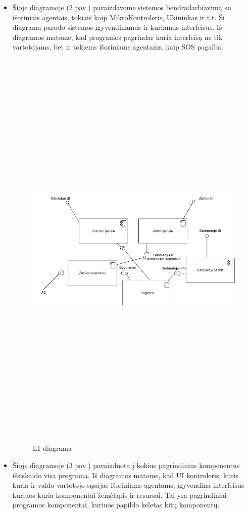 \documentclass[oneside]{VUMIFPSkursinis}
\begin{document}
	\begin{itemize}
	\item Šioje diagramoje (2 pav.) pavaizdavome sistemos bendradarbiavimą su išoriniais agentais, tokiais kaip MikroKontroleris, Ukininkas ir t.t. Ši diagrama parodo sistemos įgyvendinamus ir kuriamus interfeisus. Iš diagramos matome, kad programos pagrindas kuria interfeisą ne tik vartotojams, bet ir tokiems išoriniams agentams, kaip SOS pagalba.
	\begin{figure}[H]
		\centering	
	\includegraphics[width=17cm,height=20cm,keepaspectratio]{L1.png}
	\caption{L1 diagrama}
	\label{fig:L1}
\end{figure}
\item Šioje diagramoje (3 pav.) pavaizduota į kokius pagrindinius kompenentus išsiskaido visa programa. Iš diagramos matome, kad UI kontroleris, kuris kuria ir valdo vartotojo sąsajas išoriniams agentams, įgyvendina interfeisus kuriuos kuria komponentai žemėlapis ir resursai. Tai yra pagrindiniai programos komponentai, kuriuos papildo keletas kitų komponentų.

\end{itemize}
\pagebreak
\end{document}
